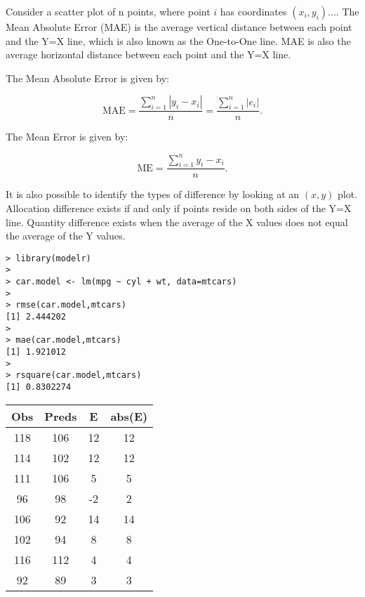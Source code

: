 \documentclass[]{report}
\begin{document}
Consider a scatter plot of n points, where point $i$ has coordinates $(x_i, y_i)...$. 
The Mean Absolute Error (MAE) is the average vertical distance between each point and the Y=X line, which is also known as the One-to-One line. MAE is also the average horizontal distance between each point and the Y=X line.

The Mean Absolute Error is given by:

\[{\displaystyle \mathrm {MAE} ={\frac {\sum _{i=1}^{n}\left|y_{i}-x_{i}\right|}{n}}={\frac {\sum _{i=1}^{n}\left|e_{i}\right|}{n}}.}\]


The Mean Error is given by:

\[{\displaystyle \mathrm {ME} ={\frac {\sum _{i=1}^{n}y_{i}-x_{i}}{n}}.} \]

It is also possible to identify the types of difference by looking at an ${\displaystyle (x,y)}$  plot. Allocation difference exists if and only if points reside on both sides of the Y=X line. Quantity difference exists when the average of the X values does not equal the average of the Y values.


\begin{framed}
\begin{verbatim}
> library(modelr)
>
> car.model <- lm(mpg ~ cyl + wt, data=mtcars)
>
> rmse(car.model,mtcars)
[1] 2.444202
>
> mae(car.model,mtcars)
[1] 1.921012
>
> rsquare(car.model,mtcars)
[1] 0.8302274
\end{verbatim}
\end{framed}
\begin{center}
\begin{tabular}{|c|c|c|c|} \hline
     Obs & Preds & E & abs(E)   \\ \hline \hline
118  & 106 &12& 12 \\ \hline
114   &102 &12& 12 \\ \hline
111  & 106 & 5 &  5 \\ \hline
 96  &  98& -2&  2 \\ \hline
106   & 92 &14& 14 \\ \hline
 102   & 94&  8 & 8 \\ \hline
 116   & 112&  4&  4 \\ \hline
 92    &89&  3 & 3 \\ \hline
 \end{tabular}
\end{center}
\end{document}
